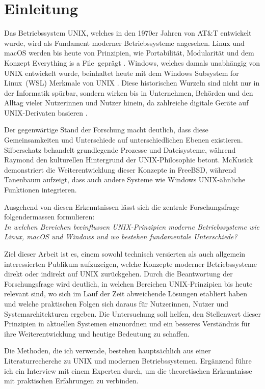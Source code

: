 \section{Einleitung}
Das Betriebssystem UNIX, welches in den 1970er Jahren von AT\&T entwickelt wurde, wird als Fundament moderner Betriebssysteme angesehen. Linux und macOS werden
bis heute von Prinzipien, wie Portabilität, Modularität und dem Konzept \glqq Everything is a File\grqq \ geprägt \cite{ArtOfUnixProgramming, ModernOS}. Windows,
welches damals unabhängig von UNIX entwickelt wurde, beinhaltet heute mit dem \glqq Windows Subsystem for Linux\grqq \ (WSL) Merkmale von UNIX \cite{WSL}.
Diese historischen Wurzeln sind nicht nur in der Informatik spürbar, sondern wirken bis in Unternehmen, Behörden und den Alltag vieler Nutzerinnen und Nutzer
hinein, da zahlreiche digitale Geräte auf UNIX-Derivaten basieren \cite{FreeBSDOS, OSConcept}.

Der gegenwärtige Stand der Forschung macht deutlich, dass diese Gemeinsamkeiten und Unterschiede auf unterschiedlichen Ebenen existieren.
Silberschatz \cite{OSConcept} behandelt grundlegende Prozesse und Dateisysteme, während Raymond \cite{ArtOfUnixProgramming} den kulturellen Hintergrund der
UNIX-Philosophie betont.  McKusick \cite{FreeBSDOS} demonstriert die Weiterentwicklung dieser Konzepte in FreeBSD, während Tanenbaum \cite{ModernOS} aufzeigt,
dass auch andere Systeme wie Windows UNIX-ähnliche Funktionen integrieren.

Ausgehend von diesen Erkenntnissen lässt sich die zentrale Forschungsfrage folgendermassen formulieren:\\
\textit{In welchen Bereichen beeinflussen UNIX-Prinzipien moderne Betriebssysteme wie Linux, macOS und Windows und wo bestehen fundamentale Unterschiede?}

Ziel dieser Arbeit ist es, einem sowohl technisch versierten als auch allgemein interessierten Publikum aufzuzeigen, welche Konzepte moderner Betriebssysteme
direkt oder indirekt auf UNIX zurückgehen. Durch die Beantwortung der Forschungsfrage wird deutlich, in welchen Bereichen UNIX-Prinzipien bis heute relevant sind,
wo sich im Lauf der Zeit abweichende Lösungen etabliert haben und welche praktischen Folgen sich daraus für Nutzerinnen, Nutzer und Systemarchitekturen ergeben.
Die Untersuchung soll helfen, den Stellenwert dieser Prinzipien in aktuellen Systemen einzuordnen und ein besseres Verständnis für ihre Weiterentwicklung und
heutige Bedeutung zu schaffen.

Die Methoden, die ich verwende, bestehen hauptsächlich aus einer Literaturrecherche zu UNIX und modernen Betriebssystemen. Ergänzend führe ich ein Interview mit
einem Experten durch, um die theoretischen Erkenntnisse mit praktischen Erfahrungen zu verbinden.